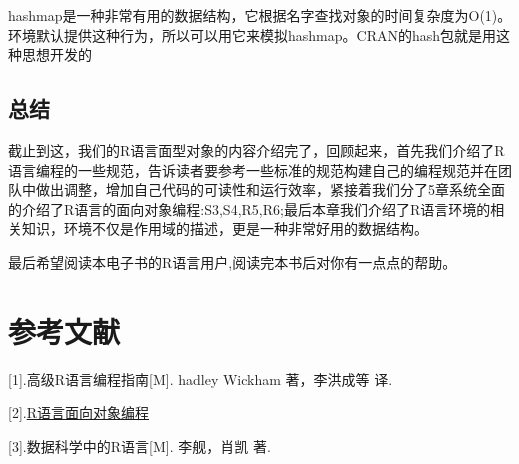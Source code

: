\documentclass[]{book}
\begin{document}
hashmap是一种非常有用的数据结构，它根据名字查找对象的时间复杂度为O(1)。环境默认提供这种行为，所以可以用它来模拟hashmap。CRAN的hash包就是用这种思想开发的

\section{总结}

截止到这，我们的R语言面型对象的内容介绍完了，回顾起来，首先我们介绍了R语言编程的一些规范，告诉读者要参考一些标准的规范构建自己的编程规范并在团队中做出调整，增加自己代码的可读性和运行效率，紧接着我们分了5章系统全面的介绍了R语言的面向对象编程:S3,S4,R5,R6;最后本章我们介绍了R语言环境的相关知识，环境不仅是作用域的描述，更是一种非常好用的数据结构。

最后希望阅读本电子书的R语言用户,阅读完本书后对你有一点点的帮助。

\chapter{参考文献}\label{Reference}

{[}1{]}.高级R语言编程指南{[}M{]}. hadley Wickham 著，李洪成等 译.

{[}2{]}.\href{https://wenku.baidu.com/view/fc1b919e10a6f524cdbf857d.html}{R语言面向对象编程}

{[}3{]}.数据科学中的R语言{[}M{]}. 李舰，肖凯 著.


\end{document}
